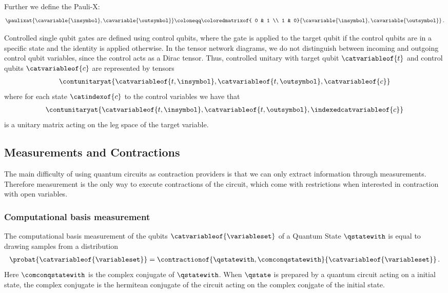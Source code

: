 Further we define the Pauli-X:
\begin{align*}
    \paulixat{\cavariable{\insymbol},\cavariable{\outsymbol}} \coloneqq
    \coloredmatrixof{
        0 & 1 \\
        1 & 0}{\cavariable{\insymbol},\cavariable{\outsymbol}} \, .
\end{align*}

Controlled single qubit gates are defined using control qubits, where the gate is applied to the target qubit if the control qubits are in a specific state and the identity is applied otherwise.
In the tensor network diagrams, we do not distinguish between incoming and outgoing control qubit variables, since the control acts as a Dirac tensor.
Thus, controlled unitary with target qubit $\catvariableof{t}$ and control qubits $\catvariableof{c}$ are represented by tensors
\begin{align*}
    \contunitaryat{\catvariableof{t,\insymbol},\catvariableof{t,\outsymbol},\catvariableof{c}}
\end{align*}
where for each state $\catindexof{c}$ to the control variables we have that
\begin{align*}
    \contunitaryat{\catvariableof{t,\insymbol},\catvariableof{t,\outsymbol},\indexedcatvariableof{c}}
\end{align*}
is a unitary matrix acting on the leg space of the target variable.

\subsection{Measurements and Contractions}

The main difficulty of using quantum circuits as contraction providers is that we can only extract information through measurements.
Therefore measurement is the only way to execute contractions of the circuit, which come with restrictions when interested in contraction with open variables.


\subsubsection{Computational basis measurement}

The computational basis measurement of the qubits $\catvariableof{\variableset}$ of a Quantum State $\qstatewith$ is equal to drawing samples from a distribution
\begin{align*}
    \probat{\catvariableof{\variableset}} = \contractionof{
        \qstatewith, \comconqstatewith
    }{\catvariableof{\variableset}} \, .
\end{align*}
Here $\comconqstatewith$ is the complex conjugate of $\qstatewith$.
When $\qstate$ is prepared by a quantum circuit acting on a initial state, the complex conjugate is the hermitean conjugate of the circuit acting on the complex conjgate of the initial state.

